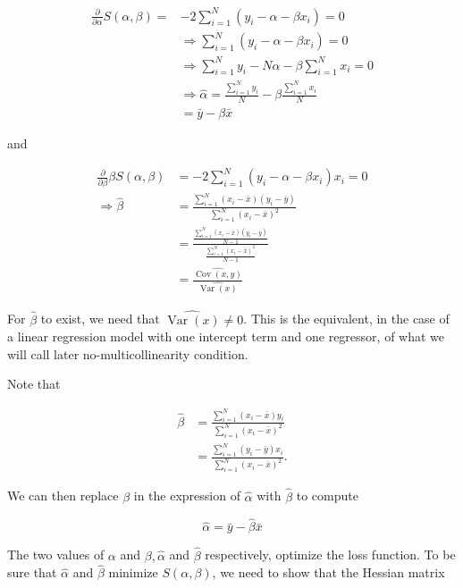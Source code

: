$$
\begin{aligned}
\frac{\partial}{\partial \alpha} S(\alpha, \beta)= & -2 \sum_{i=1}^{N}\left(y_{i}-\alpha-\beta x_{i}\right)=0 \\
& \Longrightarrow \sum_{i=1}^{N}\left(y_{i}-\alpha-\beta x_{i}\right)=0 \\
& \Longrightarrow \sum_{i=1}^{N} y_{i}-N \alpha-\beta \sum_{i=1}^{N} x_{i}=0 \\
& \Longrightarrow \widehat{\alpha}=\frac{\sum_{i=1}^{N} y_{i}}{N}-\beta \frac{\sum_{i=1}^{N} x_{i}}{N} \\
& =\bar{y}-\beta \bar{x}
\end{aligned}
$$

and

$$
\begin{aligned}
\frac{\partial}{\partial \beta} \beta S(\alpha, \beta) & =-2 \sum_{i=1}^{N}\left(y_{i}-\alpha-\beta x_{i}\right) x_{i}=0 \\
\Longrightarrow \widehat{\beta} & =\frac{\sum_{i=1}^{N}\left(x_{i}-\bar{x}\right)\left(y_{i}-\bar{y}\right)}{\sum_{i=1}^{N}\left(x_{i}-\bar{x}\right)^{2}} \\
& =\frac{\frac{\sum_{i=1}^{N}\left(x_{i}-\bar{x}\right)\left(y_{i}-\bar{y}\right)}{N-1}}{\frac{\sum_{i=1}^{N}\left(x_{i}-\bar{x}\right)^{2}}{N-1}} \\
& =\frac{\widehat{\operatorname{Cov}(x, y)}}{\widehat{\operatorname{Var}(x)}}
\end{aligned}
$$

For $\widehat{\beta}$ to exist, we need that $\widehat{\operatorname{Var}(x)} \neq 0$. This is the equivalent, in the case of a linear regression model with one intercept term and one regressor, of what we will call later no-multicollinearity condition.

Note that

$$
\begin{aligned}
\widehat{\beta} & =\frac{\sum_{i=1}^{N}\left(x_{i}-\bar{x}\right) y_{i}}{\sum_{i=1}^{N}\left(x_{i}-\bar{x}\right)^{2}} \\
& =\frac{\sum_{i=1}^{N}\left(y_{i}-\bar{y}\right) x_{i}}{\sum_{i=1}^{N}\left(x_{i}-\bar{x}\right)^{2}} .
\end{aligned}
$$

We can then replace $\beta$ in the expression of $\widehat{\alpha}$ with $\widehat{\beta}$ to compute

$$
\widehat{\alpha}=\bar{y}-\widehat{\beta} \bar{x}
$$

The two values of $\alpha$ and $\beta, \widehat{\alpha}$ and $\widehat{\beta}$ respectively, optimize the loss function. To be sure that $\widehat{\alpha}$ and $\widehat{\beta}$ minimize $S(\alpha, \beta)$, we need to show that the Hessian matrix

